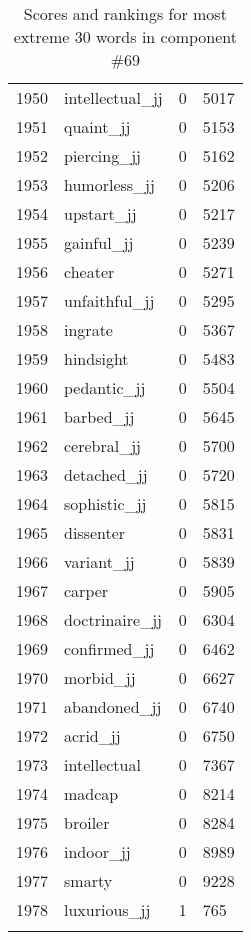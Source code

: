 \begin{longtable}[!htbp]{| rlr@{.}l |}
    1950 & intellectual\_jj & 0 & 5017 \\
    1951 & quaint\_jj & 0 & 5153 \\
    1952 & piercing\_jj & 0 & 5162 \\
    1953 & humorless\_jj & 0 & 5206 \\
    1954 & upstart\_jj & 0 & 5217 \\
    1955 & gainful\_jj & 0 & 5239 \\
    1956 & cheater & 0 & 5271 \\
    1957 & unfaithful\_jj & 0 & 5295 \\
    1958 & ingrate & 0 & 5367 \\
    1959 & hindsight & 0 & 5483 \\
    1960 & pedantic\_jj & 0 & 5504 \\
    1961 & barbed\_jj & 0 & 5645 \\
    1962 & cerebral\_jj & 0 & 5700 \\
    1963 & detached\_jj & 0 & 5720 \\
    1964 & sophistic\_jj & 0 & 5815 \\
    1965 & dissenter & 0 & 5831 \\
    1966 & variant\_jj & 0 & 5839 \\
    1967 & carper & 0 & 5905 \\
    1968 & doctrinaire\_jj & 0 & 6304 \\
    1969 & confirmed\_jj & 0 & 6462 \\
    1970 & morbid\_jj & 0 & 6627 \\
    1971 & abandoned\_jj & 0 & 6740 \\
    1972 & acrid\_jj & 0 & 6750 \\
    1973 & intellectual & 0 & 7367 \\
    1974 & madcap & 0 & 8214 \\
    1975 & broiler & 0 & 8284 \\
    1976 & indoor\_jj & 0 & 8989 \\
    1977 & smarty & 0 & 9228 \\
    1978 & luxurious\_jj & 1 & 765 \\
    \hline
    \caption{Scores and rankings for most extreme 30 words in component \#69} \\
\end{longtable}
